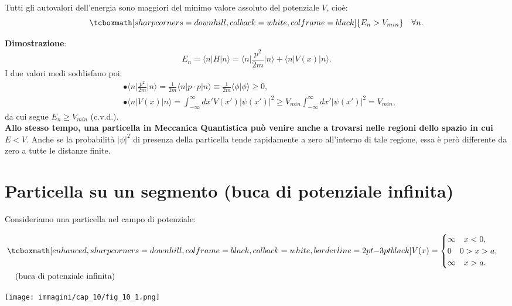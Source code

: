 Tutti gli autovalori dell'energia sono maggiori del minimo valore assoluto del potenziale $V$, cioè:
	\begin{equation}
		\tcboxmath[sharp corners=downhill, colback=white, colframe=black]{
			E_n >V_{min} 
			}\quad \forall n.
	\end{equation}
	
\textbf{Dimostrazione}:
	\begin{equation}
		E_n = \langle n \vert H \vert n \rangle =  \langle n \vert \frac{p ^2}{2m} \vert n \rangle + \langle n \vert V(x) \vert n \rangle .
	\end{equation}
I due  valori medi soddisfano poi:
	\begin{align}
		&\bullet \langle n \vert \frac{p ^2}{2m} \vert n \rangle =\frac{1}{2m} \langle n \vert p\cdot p\vert n \rangle \equiv \frac{1}{2m} \langle \phi \vert  \phi \rangle \ge 0 , \\[0.3cm]
		&\bullet \langle n \vert V(x) \vert n \rangle = \int _{-\infty} ^{\infty} dx' V(x') \vert \psi (x') \vert ^2 \geq V_{min} \int _{-\infty} ^{\infty} dx'  \vert \psi (x') \vert ^2 = V_{min} , 
	\end{align}
da cui segue $E_n \geq V_{min}$ (c.v.d.).\\

\textbf{Allo stesso tempo, una particella in Meccanica Quantistica può venire anche a trovarsi nelle regioni dello spazio in cui $E<V$}. Anche se la probabilità $|\psi|^2$ di presenza della particella tende rapidamente a zero all'interno di tale regione, essa è però differente da zero a tutte le distanze finite.
\section{Particella su un segmento (buca di potenziale infinita)}
Consideriamo una particella nel campo di potenziale:\\

\begin{minipage}{.55\textwidth}
	\begin{align}
		&\tcboxmath[enhanced, sharp corners=downhill, colframe=black, colback=white, borderline={2pt}{-3pt}{black}]{
			V(x)= 
			\begin{cases}
			\infty \quad x<0,\\
			0 \quad 0>x>a, \\
			\infty \quad x>a.
			\end{cases} }
			\\
			&\quad \textrm{(buca di potenziale infinita)} \nonumber
			\end{align}	
			\end{minipage}
\hspace{.5cm}
\begin{minipage}{.35\textwidth}
\texttt{[image: immagini/cap\_10/fig\_10\_1.png]}
\end{minipage}\\

